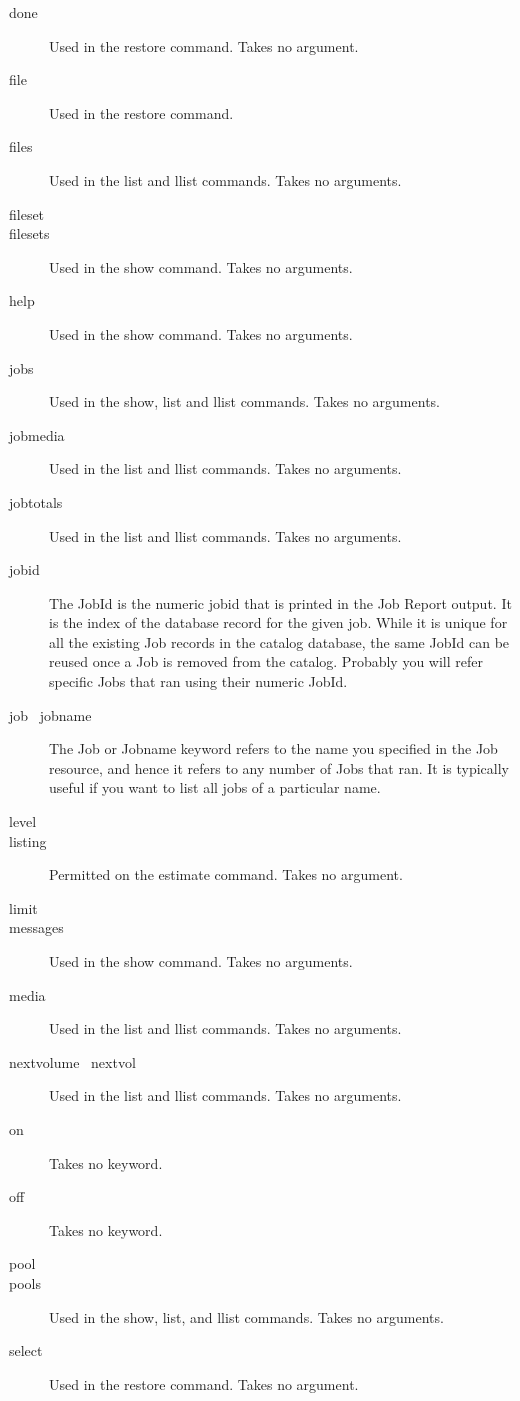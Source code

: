 \begin{description}
\item [done]
  Used in the restore command. Takes no argument.
\item [file]
  Used in the restore command.
\item [files]
  Used in the list and llist commands. Takes no arguments.
\item [fileset]
\item [filesets]
  Used in the show command. Takes no arguments.
\item [help]
  Used in the show command. Takes no arguments.
\item [jobs]
  Used in the show, list and llist commands. Takes no arguments.
\item [jobmedia]
  Used in the list and llist commands. Takes no arguments.
\item [jobtotals]
  Used in the list and llist commands. Takes no arguments.
\item [jobid]
  The JobId is the numeric jobid that is printed in the Job
  Report output. It is the index of the database record for the
  given job. While it is unique for all the existing Job records
  in the catalog database, the same JobId can be reused once a
  Job is removed from the catalog. Probably you will refer
  specific Jobs that ran using their numeric JobId.
\item [job \textbar\  jobname]
  The Job or Jobname keyword refers to the name you specified
  in the Job resource, and hence it refers to any number of
  Jobs that ran.  It is typically useful if you want to list
  all jobs of a particular name.
\item [level]
\item [listing]
  Permitted on the estimate command. Takes no argument.
\item [limit]
\item [messages]
  Used in the show command. Takes no arguments.
\item [media]
  Used in the list and llist commands. Takes no arguments.
\item [nextvolume \textbar\ nextvol]
  Used in the list and llist commands. Takes no arguments.
\item [on]
  Takes no keyword.
\item [off]
  Takes no keyword.
\item [pool]
\item [pools]
  Used in the show, list, and llist commands. Takes no arguments.
\item [select]
  Used in the restore command. Takes no argument.

\end{description}

